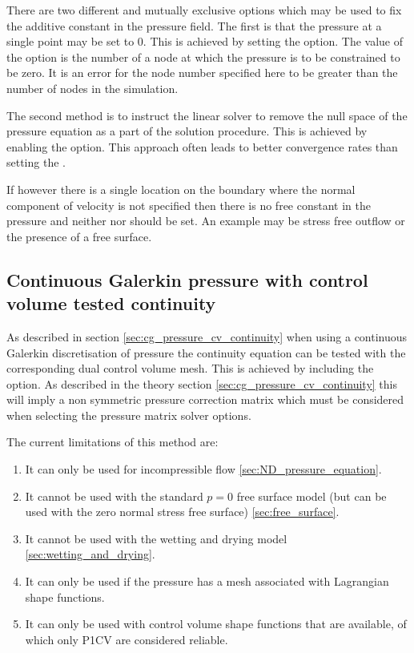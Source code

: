 There are two different and mutually exclusive options which may be used to
fix the additive constant in the pressure field. The first is that the
pressure at a single point may be set to 0. This is achieved by setting the
 option. The
value of the option is the number of a node at which the pressure is to be
constrained to be zero. It is an error for the node number specified here to
be greater than the number of nodes in the simulation.

The second method is to instruct the linear solver to remove the null space
of the pressure equation as a part of the solution procedure. This is
achieved by enabling the\linebreak
{}
option. This approach often leads to better convergence rates than setting
the .

If however there is a single location on the boundary where the normal
component of velocity is not specified then there is no free constant in the
pressure and neither  nor
 should be set. An example
may be stress free outflow or the presence of a free surface.

\subsection{Continuous Galerkin pressure with control volume tested continuity}
\label{sec:config_cg_pressure_cv_continuity}

As described in section \ref{sec:cg_pressure_cv_continuity} when using a continuous Galerkin 
discretisation of pressure the continuity equation can be tested with the corresponding 
dual control volume mesh. This is achieved by including the \linebreak 
{}
option. As described in the theory section \ref{sec:cg_pressure_cv_continuity} this will imply a 
non symmetric pressure correction matrix which must be considered when selecting the pressure 
matrix solver options.

The current limitations of this method are:
\begin{enumerate}
  \item It can only be used for incompressible flow \ref{sec:ND_pressure_equation}.
  \item It cannot be used with the standard $p=0$ free surface model (but can be used with the zero normal stress free surface) \ref{sec:free_surface}.
  \item It cannot be used with the wetting and drying model \ref{sec:wetting_and_drying}.
  \item It can only be used if the pressure has a mesh associated with Lagrangian shape functions.
  \item It can only be used with control volume shape functions that are available, of which only P1CV are considered reliable. 
\end{enumerate}

